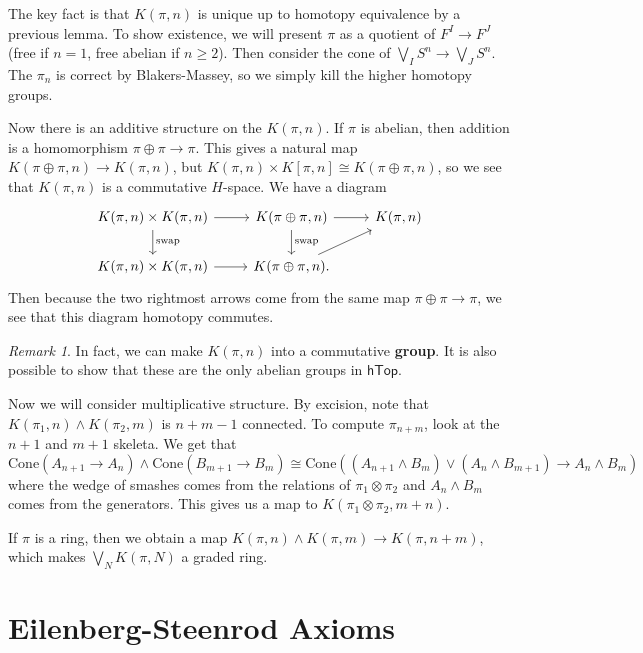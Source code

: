 \documentclass[leqno, openany]{memoir}
\theoremstyle{definition}
\theoremstyle{remark}
\newtheorem{rmk}[thm]{Remark}
\theoremstyle{plain}
\theoremstyle{definition}
\theoremstyle{remark}
\newcommand{\mr}[1]{\mathrm{#1}}
\newcommand{\ms}[1]{\mathsf{#1}}
\begin{document}
The key fact is that $K(\pi, n)$ is unique up to homotopy equivalence by a previous lemma. To show existence, we will present $\pi$ as a quotient of $F^I \to F^J$ (free if $n=1$, free abelian if $n \geq 2$). Then consider the cone of $\bigvee_I S^n \to \bigvee_J S^n$. The $\pi_n$ is correct by Blakers-Massey, so we simply kill the higher homotopy groups.

Now there is an additive structure on the $K(\pi,n)$. If $\pi$ is abelian, then addition is a homomorphism $\pi \oplus \pi \to \pi$. This gives a natural map $K(\pi \oplus \pi, n) \to K(\pi,n)$, but $K(\pi,n) \times K[\pi, n] \cong K(\pi \oplus \pi, n)$, so we see that $K(\pi,n)$ is a commutative $H$-space. We have a diagram
\begin{equation*}
\begin{tikzcd}
    K(\pi,n) \times K(\pi, n) \arrow{d}{\text{swap}} \arrow{r} & K(\pi \oplus \pi, n) \arrow{r} \arrow{d}{\text{swap}} &  K(\pi,n) \\
    K(\pi, n) \times K(\pi, n) \arrow{r} & K(\pi \oplus \pi, n). \arrow{ur}
\end{tikzcd}
\end{equation*}
Then because the two rightmost arrows come from the same map $\pi \oplus \pi \to \pi$, we see that this diagram homotopy commutes.

\begin{rmk}
    In fact, we can make $K(\pi, n)$ into a commutative \textbf{group}. It is also possible to show that these are the only abelian groups in $\ms{hTop}$. 
\end{rmk}

Now we will consider multiplicative structure. By excision, note that $K(\pi_1, n) \wedge K(\pi_2, m)$ is $n+m-1$ connected. To compute $\pi_{n+m}$, look at the $n+1$ and $m+1$ skeleta. We get that
\[\mr{Cone}(A_{n+1} \to A_n) \wedge \mr{Cone}(B_{m+1} \to B_m) \cong \mr{Cone}((A_{n+1} \wedge B_m) \vee (A_n \wedge B_{m+1}) \to A_n \wedge B_m) \]
where the wedge of smashes comes from the relations of $\pi_1 \otimes \pi_2$ and $A_n \wedge B_m$ comes from the generators. This gives us a map to $K(\pi_1 \otimes \pi_2, m+n)$.

If $\pi$ is a ring, then we obtain a map $K(\pi, n) \wedge K(\pi, m) \to K(\pi, n+m)$, which makes $\bigvee_N K(\pi, N)$ a graded ring.

\section{Eilenberg-Steenrod Axioms}%
\label{sec:eilenberg_steenrod_axioms}
\end{document}
